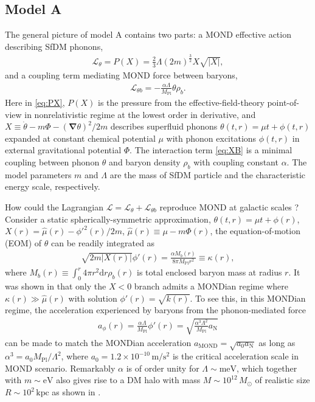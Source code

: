 \documentclass[aps,prd,twocolumn,10pt,groupedaddress]{revtex4-1}
\begin{document}
\subsection{Model A} \label{subsec:model1}

The general picture of model A \cite{Berezhiani:2015bqa} contains two parts: a MOND effective action describing SfDM phonons,
\begin{align}\label{eq:PX}
\mathcal{L}_\theta=P(X)=\frac23\Lambda(2m)^\frac32X\sqrt{|X|},
\end{align}
and a coupling term mediating MOND force between baryons,
\begin{align}\label{eq:XB}
\mathcal{L}_{\theta b}=-\frac{\alpha\Lambda}{M_\mathrm{Pl}}\theta\rho_b.
\end{align}
Here in \eqref{eq:PX}, $P(X)$ is the pressure from the effective-field-theory point-of-view in nonrelativistic regime at the lowest order in derivative, and $X\equiv\dot{\theta}-m\Phi-(\mathbf{\nabla}\theta)^2/2m$ describes superfluid phonons $\theta(t,r)=\mu t+\phi(t,r)$ expanded at constant chemical potential $\mu$ with phonon excitations $\phi(t,r)$ in external gravitational potential $\Phi$. The interaction term \eqref{eq:XB} is a minimal coupling between phonon $\theta$ and baryon density $\rho_b$ with coupling constant $\alpha$. The model parameters $m$ and $\Lambda$ are the mass of SfDM particle and the characteristic energy scale, respectively.

How could the Lagrangian $\mathcal{L}=\mathcal{L}_\theta+\mathcal{L}_{\theta b}$ reproduce MOND at galactic scales ? Consider a static spherically-symmetric approximation, $\theta(t,r)=\mu t+\phi(r)$, $X(r)=\hat{\mu}(r)-\phi'^2(r)/2m$, $\hat{\mu}(r)\equiv\mu-m\Phi(r)$, the equation-of-motion (EOM) of $\theta$ can be readily integrated as
\begin{align}\label{eq:EOM1}
\sqrt{2m|X(r)|}\phi'(r)=\frac{\alpha M_b(r)}{8\pi M_\mathrm{Pl}r^2}\equiv\kappa(r),
\end{align}
where $M_b(r)\equiv\int_0^r 4\pi r^2\mathrm{d}r\rho_b(r)$ is total enclosed baryon mass at radius $r$. It was shown in \cite{Berezhiani:2015bqa} that only the $X<0$ branch admits a MONDian regime where $\kappa(r)\gg\hat{\mu}(r)$ with solution $\phi'(r)=\sqrt{k(r)}$. To see this, in this MONDian regime, the acceleration experienced by baryons from the phonon-mediated force
\begin{align}
a_\phi(r)=\frac{\alpha\Lambda}{M_\mathrm{Pl}}\phi'(r)
=\sqrt{\frac{\alpha^3\Lambda^2}{M_\mathrm{Pl}}a_\mathrm{N}}
\end{align}
can be made to match the MONDian acceleration $a_\mathrm{MOND}=\sqrt{a_0a_\mathrm{N}}$ as long as $\alpha^3=a_0M_\mathrm{Pl}/\Lambda^2$, where $a_0=1.2\times10^{-10}\,\mathrm{m/s^2}$ is the critical acceleration scale in MOND scenario. Remarkably $\alpha$ is of order unity for $\Lambda\sim\mathrm{meV}$, which together with $m\sim\mathrm{eV}$ also gives rise to a DM halo with mass $M\sim10^{12}\,M_\odot$ of realistic size $R\sim10^2\,\mathrm{kpc}$ as shown in \cite{Berezhiani:2015bqa}.
\end{document}
